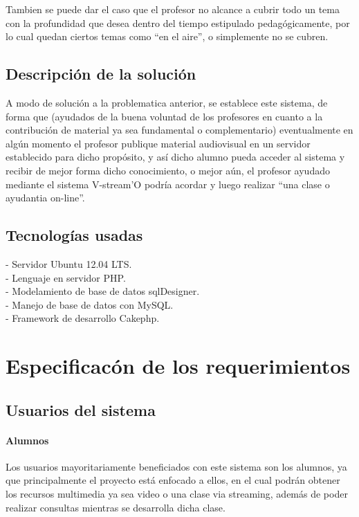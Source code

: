 \documentclass[12pt]{article}
\begin{document}
Tambien se puede dar el caso que el profesor no alcance a cubrir todo un tema con la profundidad que desea
dentro del tiempo estipulado pedagógicamente, por lo cual quedan ciertos temas como ``en el aire'', o
simplemente no se cubren.


\subsection{Descripción de la solución}
A modo de solución a la problematica anterior, se establece este sistema, de forma que (ayudados de la buena
voluntad de los profesores en cuanto a la contribución de material ya sea fundamental o complementario) 
eventualmente en algún momento el profesor publique material 
audiovisual en un servidor establecido para dicho propósito, y así dicho alumno pueda acceder al sistema 
y recibir de mejor forma dicho conocimiento, o mejor aún, el profesor ayudado mediante el sistema V-stream'O podría
acordar y luego realizar ``una clase o ayudantia on-line''.

\subsection{Tecnologías usadas}

- Servidor Ubuntu 12.04 LTS.\\

- Lenguaje en servidor PHP.\\

- Modelamiento de base de datos sqlDesigner.\\

- Manejo de base de datos con MySQL.\\

- Framework de desarrollo Cakephp.\\ 


\newpage
\section{Especificacón de los requerimientos}
\subsection{Usuarios del sistema}
\paragraph{Alumnos\\}

Los usuarios mayoritariamente beneficiados con este sistema son los alumnos, ya que principalmente
el proyecto está enfocado a ellos, en el cual podrán obtener los recursos multimedia ya sea video
o una clase via streaming, además de poder realizar consultas mientras se desarrolla dicha clase.
\end{document}
